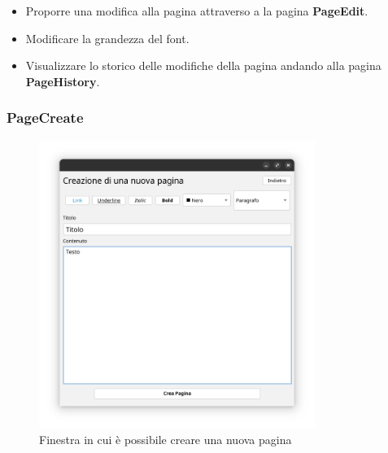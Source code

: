 \documentclass{article}
\begin{document}
	\begin{itemize}
		\item Proporre una modifica alla pagina attraverso a la pagina \textbf{PageEdit}.
		
		\item Modificare la grandezza del font.
		
		\item Visualizzare lo storico delle modifiche della pagina andando alla pagina \textbf{PageHistory}.
	\end{itemize}
	
	
	\newpage
	
	{\subsubsection{PageCreate}}
	
		\begin{figure}[htbp]
		\centering
		\includegraphics[width=0.8\textwidth,height=0.8\textheight,keepaspectratio]{page_create.png}
		\caption{Finestra in cui \`e possibile creare una nuova pagina}
		\label{fig:5}
	\end{figure}
	
	\newpage
	
	
\end{document}

